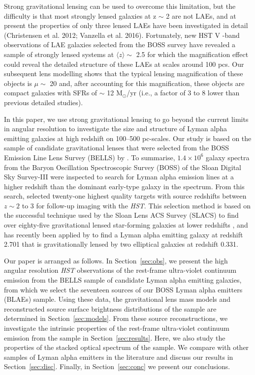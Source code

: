 \documentclass[a4paper,fleqn,usenatbib]{mnras}
\begin{document}
Strong gravitational lensing can be used to overcome this limitation, but the difficulty is that most strongly lensed galaxies at z $\sim$ 2 are not LAEs, and at present the properties of only three lensed LAEs have been investigated in detail (Christensen et al. 2012; Vanzella et al. 2016). Fortunately, new HST V -band observations of LAE galaxies selected from the BOSS survey have revealed a sample of strongly lensed systems at  $\langle z\rangle \sim$ 2.5 for which the magnification effect could reveal the detailed structure of these LAEs at scales around 100 pcs. Our subsequent lens modelling shows that the typical lensing magnification of these objects is $\mu \sim$ 20 and, after accounting for this magnification, these objects are compact galaxies with SFRs of $\sim$ 12 M$_\odot$/yr (i.e., a factor of 3 to 8 lower than previous detailed studies).

In this paper, we use strong gravitational lensing to go beyond the current limits in angular resolution to investigate the size and structure of Lyman alpha emitting galaxies at high redshift on 100--500 pc-scales. Our study is based on the sample of candidate gravitational lenses that were selected from the BOSS Emission Line Lens Survey (BELLS) by \citet{Shu16}. To summarise, $1.4\times10^6$ galaxy spectra from the Baryon Oscillation Spectroscopic Survey (BOSS) of the Sloan Digital Sky Survey-III were inspected to search for Lyman alpha emission lines at a higher redshift than the dominant early-type galaxy in the spectrum. From this search, \citet{Shu16} selected twenty-one highest quality targets with source redshifts between $z\sim 2$ to 3 for follow-up imaging with the {\it HST}. This selection method is based on the successful technique used by the Sloan Lens ACS Survey (SLACS) to find over eighty-five gravitational lensed star-forming galaxies at lower redshifts \citep{auger09,bolton08}, and has recently been applied by \citet{Shu16a} to find a Lyman alpha emitting galaxy at redshift 2.701 that is gravitationally lensed by two elliptical galaxies at redshift 0.331.

Our paper is arranged as follows. In Section~\ref{sec:obs}, we present the high angular resolution {\it HST} observations of the rest-frame ultra-violet continuum emission from the BELLS sample of candidate Lyman alpha emitting galaxies, from which we select the seventeen sources of our BOSS Lyman alpha emitters (BLAEs) sample. Using these data, the gravitational lens mass models and reconstructed source surface brightness distributions of the sample are determined in Section~\ref{sec:models}. From these source reconstructions, we investigate the intrinsic properties of the rest-frame ultra-violet continuum emission from the sample in Section~\ref{sec:results}. Here, we also study the properties of the stacked optical spectrum of the sample. We compare with other samples of Lyman alpha emitters in the literature and discuss our results in Section~\ref{sec:disc}. Finally, in Section~\ref{sec:conc} we present our conclusions.
\end{document}
